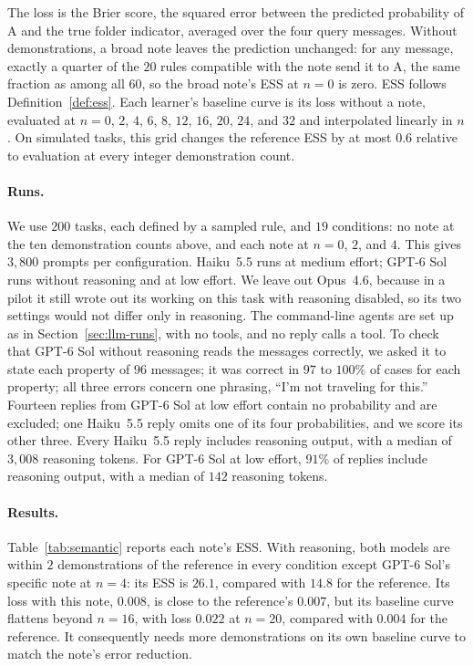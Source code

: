 The loss is the Brier score, the squared error between the predicted probability of A and the true folder indicator, averaged over the four query messages. Without demonstrations, a broad note leaves the prediction unchanged: for any message, exactly a quarter of the $20$ rules compatible with the note send it to A, the same fraction as among all $60$, so the broad note's ESS at $n=0$ is zero. ESS follows Definition~\ref{def:ess}. Each learner's baseline curve is its loss without a note, evaluated at $n=0$, $2$, $4$, $6$, $8$, $12$, $16$, $20$, $24$, and $32$ and interpolated linearly in $n$. On simulated tasks, this grid changes the reference ESS by at most $0.6$ relative to evaluation at every integer demonstration count.

\paragraph{Runs.}
We use $200$ tasks, each defined by a sampled rule, and $19$ conditions: no note at the ten demonstration counts above, and each note at $n=0$, $2$, and $4$. This gives $3{,}800$ prompts per configuration. Haiku~5.5 runs at medium effort; GPT-6 Sol runs without reasoning and at low effort. We leave out Opus~4.6, because in a pilot it still wrote out its working on this task with reasoning disabled, so its two settings would not differ only in reasoning. The command-line agents are set up as in Section~\ref{sec:llm-runs}, with no tools, and no reply calls a tool. To check that GPT-6 Sol without reasoning reads the messages correctly, we asked it to state each property of $96$ messages; it was correct in $97$ to $100\%$ of cases for each property; all three errors concern one phrasing, ``I'm not traveling for this.'' Fourteen replies from GPT-6 Sol at low effort contain no probability and are excluded; one Haiku~5.5 reply omits one of its four probabilities, and we score its other three. Every Haiku~5.5 reply includes reasoning output, with a median of $3{,}008$ reasoning tokens. For GPT-6 Sol at low effort, $91\%$ of replies include reasoning output, with a median of $142$ reasoning tokens.

\paragraph{Results.}
Table~\ref{tab:semantic} reports each note's ESS. With reasoning, both models are within $2$ demonstrations of the reference in every condition except GPT-6 Sol's specific note at $n=4$: its ESS is $26.1$, compared with $14.8$ for the reference. Its loss with this note, $0.008$, is close to the reference's $0.007$, but its baseline curve flattens beyond $n=16$, with loss $0.022$ at $n=20$, compared with $0.004$ for the reference. It consequently needs more demonstrations on its own baseline curve to match the note's error reduction.

